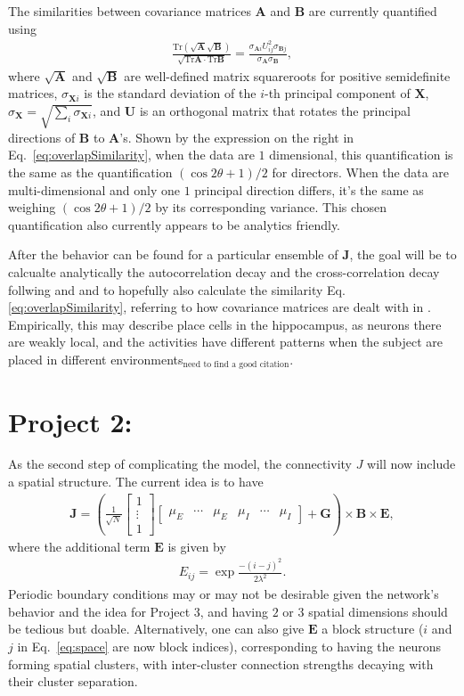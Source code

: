 \documentclass[11pt,openany,oneside]{article} %
\newcommand{\ooo}[1]{\left( {#1}\right)}\newcommand{\mooo}[1]{\big( {#1}\big)}\newcommand{\looo}[1]{\left( {#1}\right.}\newcommand{\rooo}[1]{\left. {#1}\right)}%
\newcommand{\bmx}[1]{\begin{bmatrix}#1\end{bmatrix}}%
\newcommand{\bd}[1]{\boldsymbol{#1}}%
\newcommand{\Tr}{\mathrm{Tr}}
\begin{document}
The similarities between covariance matrices $\bd{A}$ and $\bd{B}$ are currently quantified using
\begin{align}
  \label{eq:overlapSimilarity}
  \frac{\Tr(\sqrt{\bd{A}}\sqrt{\bd{B}})}{\sqrt{\Tr \bd{A} \cdot \Tr \bd{B}}} = \frac{\sigma_{\bd{A}i}U_{ij}^2\sigma_{\bd{B}j}}{\sigma_{\bd{A}} \sigma_{\bd{B}}},
\end{align}
where $\sqrt{\bd{A}}$ and $\sqrt{\bd{B}}$ are well-defined matrix squareroots for positive
semidefinite matrices, $\sigma_{\bd{X}i}$ is the standard deviation of the $i$-th principal
component of $\bd{X}$, $\sigma_{\bd{X}}=\sqrt{\sum_i\sigma_{\bd{X}i}}$, and $\bd{U}$ is an
orthogonal matrix that rotates the principal directions of $\bd{B}$ to $\bd{A}$'s.  Shown by the
expression on the right in Eq.~\ref{eq:overlapSimilarity}, when the data are $1$ dimensional, this
quantification is the same as the quantification $(\cos 2\theta+1)/2$ for directors.  When the data
are multi-dimensional and only one $1$ principal direction differs, it's the same as weighing
$(\cos 2\theta+1)/2$ by its corresponding variance.  This chosen quantification also currently
appears to be analytics friendly.

After the behavior can be found for a particular ensemble of $\bd{J}$, the goal will be to calcualte
analytically the autocorrelation decay and the cross-correlation decay follwing
\citet{kadmon2015Transition} and \citet{clark2022Dimension} and to hopefully also calculate the
similarity Eq.\ref{eq:overlapSimilarity}, referring to how covariance matrices are dealt with in
\cite{clark2022Dimension}.  Empirically, this may describe place cells in the hippocampus, as
neurons there are weakly local, and the activities have different patterns
when the subject are placed in different
environments$_{\text{need to find a good citation}}$.

\section{Project 2:}
As the second step of complicating the model, the connectivity $J$ will now include a spatial
structure.  The current idea is to have
\begin{align}
  \label{eq:spatial}
  \bd{J} = \ooo{\frac{1}{\sqrt{N}}\bmx{1\\\vdots\\1}\bmx{\mu_E&\cdots&\mu_E&\mu_I&\cdots&\mu_I}+\bd{G}}\times\bd{B}\times\bd{E},
\end{align}
where the additional term $\bd{E}$ is given by
\begin{align}
  \label{eq:space}
  E_{ij} = \exp\frac{-(i-j)^2}{2\lambda^2}.
\end{align}
Periodic boundary conditions may or may not be desirable given the network's behavior and the idea
for Project $3$, and having
$2$ or $3$ spatial dimensions should be tedious but doable.  Alternatively, one can also give
$\bd{E}$ a block structure ($i$ and $j$ in Eq.~\ref{eq:space} are now block indices),
corresponding to having the neurons forming spatial clusters, with inter-cluster connection
strengths decaying with their cluster separation.
\end{document}

